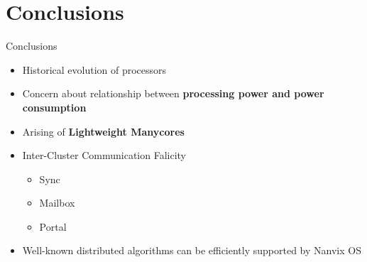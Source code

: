 \section{Conclusions}

	\begin{frame}[fragile]{Conclusions}
		\begin{itemize}
			\item Historical evolution of processors
			\item Concern about relationship between \textbf{processing power and power consumption}
			\item Arising of \textbf{Lightweight Manycores}
			\item Inter-Cluster Communication Falicity
			\begin{itemize}
				\item Sync
				\item Mailbox
				\item Portal
			\end{itemize}
			\item Well-known distributed algorithms can be efficiently supported by Nanvix OS 
		\end{itemize}
		
	\end{frame}


